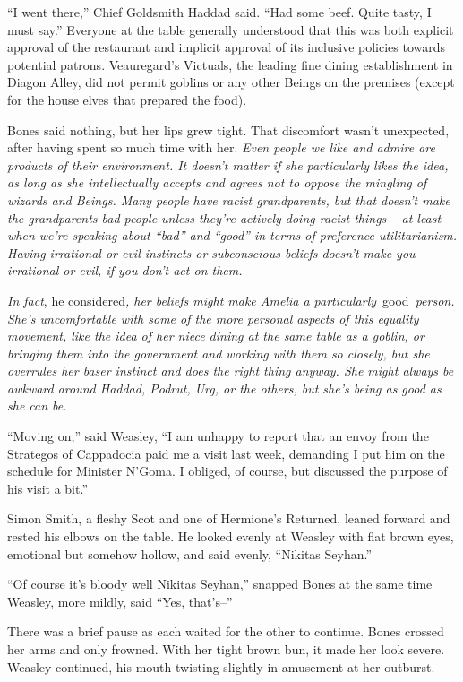 ``I went there,'' Chief Goldsmith Haddad said. ``Had some beef. Quite
tasty, I must say.'' Everyone at the table generally understood that
this was both explicit approval of the restaurant and implicit approval
of its inclusive policies towards potential patrons. Veauregard's
Victuals, the leading fine dining establishment in Diagon Alley, did not
permit goblins or any other Beings on the premises (except for the house
elves that prepared the food).

Bones said nothing, but her lips grew tight. That discomfort wasn't
unexpected, after having spent so much time with her. \emph{Even people
we like and admire are products of their environment. It doesn't matter
if she particularly likes the idea, as long as she intellectually
accepts and agrees not to oppose the mingling of wizards and Beings.
Many people have racist grandparents, but that doesn't make the
grandparents bad people unless they're actively doing racist things --
at least when we're speaking about ``bad'' and ``good'' in terms of
preference utilitarianism. Having irrational or evil instincts or
subconscious beliefs doesn't make you irrational or evil, if you don't
act on them.}

\emph{In fact}, he considered\emph{, her beliefs might make Amelia a
particularly}~good~\emph{person. She's uncomfortable with some of the
more personal aspects of this equality movement, like the idea of her
niece dining at the same table as a goblin, or bringing them into the
government and working with them so closely, but she overrules her baser
instinct and does the right thing anyway. She might always be awkward
around Haddad, Podrut, Urg, or the others, but she's being as good as
she can be.}

``Moving on,'' said Weasley, ``I am unhappy to report that an envoy from
the Strategos of Cappadocia paid me a visit last week, demanding I put
him on the schedule for Minister N'Goma. I obliged, of course, but
discussed the purpose of his visit a bit.''

Simon Smith, a fleshy Scot and one of Hermione's Returned, leaned
forward and rested his elbows on the table. He looked evenly at Weasley
with flat brown eyes, emotional but somehow hollow, and said evenly,
``Nikitas Seyhan.''

``Of course it's bloody well Nikitas Seyhan,'' snapped Bones at the same
time Weasley, more mildly, said ``Yes, that's--''

There was a brief pause as each waited for the other to continue. Bones
crossed her arms and only frowned. With her tight brown bun, it made her
look severe. Weasley continued, his mouth twisting slightly in amusement
at her outburst.

